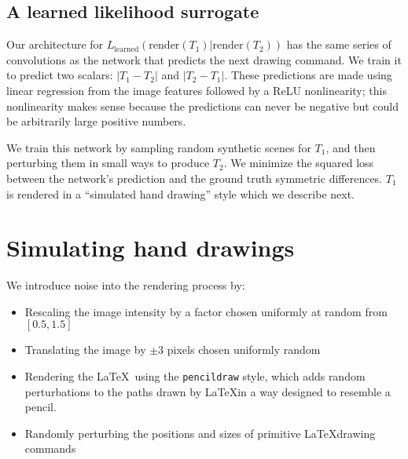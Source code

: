 \documentclass{article}
\newcommand{\probability}{\mathds{P}} %
\begin{document}
\subsection{A learned likelihood surrogate}

Our architecture for
$L_{\text{learned}}(\text{render}(T_1)|\text{render}(T_2))$ has the
same series of convolutions as the network that predicts the next
drawing command. We train it to predict two scalars: $|T_1 - T_2|$ and
$|T_2 - T_1|$.  These predictions are made using linear regression
from the image features followed by a ReLU nonlinearity; this
nonlinearity makes sense because the predictions can never be negative
but could be arbitrarily large positive numbers.

We train this network by sampling random synthetic scenes for $T_1$,
and then perturbing them in small ways to produce $T_2$.
We minimize the squared loss between the network's prediction and the ground truth symmetric differences.
$T_1$ is rendered in a ``simulated hand drawing'' style which we describe next.

\section{Simulating hand drawings}

We introduce noise into the rendering process by:

\begin{itemize}
\item Rescaling the image intensity by a factor chosen uniformly at random from $[0.5,1.5]$
\item Translating the image by $\pm 3$ pixels chosen uniformly random
\item Rendering the \LaTeX~using the \verb|pencildraw| style,
  which adds random perturbations to the paths drawn by \LaTeX in a way designed to resemble a pencil.
\item Randomly perturbing the positions and sizes of primitive  \LaTeX drawing commands
  \end{itemize}




\end{document}
